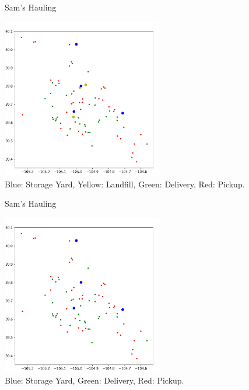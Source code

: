 \documentclass{beamer}
\begin{document}
\begin{frame}{Sam's Hauling}
	\begin{center}
	\includegraphics[width=7cm]{rawdata.png}\\
	Blue: Storage Yard, Yellow: Landfill, Green: Delivery, Red: Pickup.
	\end{center}
\end{frame}


\begin{frame}{Sam's Hauling}
	\begin{center}
	\includegraphics[width=7cm]{rawdata_nolf.png}\\
	Blue: Storage Yard, Green: Delivery, Red: Pickup.
	\end{center}
\end{frame}
\end{document}
